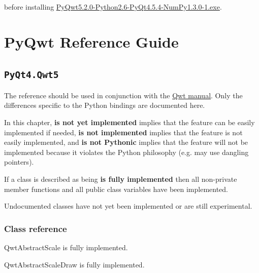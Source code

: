 \documentclass[a4paper,10pt,english]{manual}
\begin{document}
before installing
\href{http://prdownloads.sourceforge.net/pyqwt/PyQwt5.2.0-Python2.6-PyQt4.5.4-NumPy1.3.0-1.exe}{PyQwt5.2.0-Python2.6-PyQt4.5.4-NumPy1.3.0-1.exe}.

\resetcurrentobjects
\hypertarget{--doc-reference}{}

\chapter{PyQwt Reference Guide}
\hypertarget{module-PyQt4.Qwt5}{}
\modulesynopsis{}

\section{\texttt{PyQt4.Qwt5}}

The reference should be used in conjunction with the
\href{http://qwt.sourceforge.net}{Qwt manual}.
Only the differences specific to the Python bindings are documented here.

In this chapter, \textbf{is not yet implemented} implies that the feature can
be easily implemented if needed, \textbf{is not implemented} implies that the
feature is not easily implemented, and \textbf{is not Pythonic} implies that
the feature will not be implemented because it violates the Python philosophy
(e.g. may use dangling pointers).

If a class is described as being \textbf{is fully implemented} then all non-private
member functions and all public class variables have been implemented.

Undocumented classes have not yet been implemented or are still experimental.


\subsection{Class reference}

\hypertarget{PyQt4.Qwt5.QwtAbstractScale}{}\begin{classdesc}{QwtAbstractScale}{}
is fully implemented.
\end{classdesc}

\hypertarget{PyQt4.Qwt5.QwtAbstractScaleDraw}{}\begin{classdesc}{QwtAbstractScaleDraw}{}
is fully implemented.
\end{classdesc}
\end{document}
